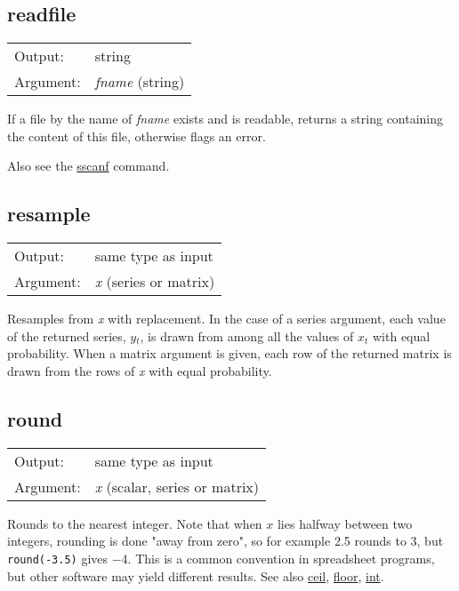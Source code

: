 \subsection{readfile}
\hypertarget{func-readfile}{}

\begin{tabular}{ll}
Output:     & string\\
Argument:   & \textsl{fname} (string)\\
\end{tabular}

	  If a file by the name of \textsl{fname} exists and
	  is readable, returns a string containing the content of
	  this file, otherwise flags an error.  

	  Also see the \hyperlink{cmd-sscanf}{sscanf} command.

\subsection{resample}
\hypertarget{func-resample}{}

\begin{tabular}{ll}
Output:     & same type as input\\
Argument:   & \textsl{x} (series or matrix)\\
\end{tabular}

	  Resamples from \textsl{x} with replacement.  In the
	  case of a series argument, each value of the returned series,
	  \ensuremath{y}\ensuremath{_{t}}, is drawn from among all the values
	  of \ensuremath{x}\ensuremath{_{t}} with equal probability.  When
	  a matrix argument is given, each row of the returned matrix
	  is drawn from the rows of \textsl{x} with equal
	  probability.

\subsection{round}
\hypertarget{func-round}{}

\begin{tabular}{ll}
Output:     & same type as input\\
Argument:   & \textsl{x} (scalar, series or matrix)\\
\end{tabular}

	  Rounds to the nearest integer. Note that when \ensuremath{x}
	  lies halfway between two integers, rounding is done "away
	  from zero", so for example 2.5 rounds to 3, but 
	  \texttt{round(-3.5)} gives $-$4. This is a common
	  convention in spreadsheet programs, but other software may
	  yield different results.
	  See also \hyperlink{func-ceil}{ceil}, \hyperlink{func-floor}{floor}, \hyperlink{func-int}{int}.

